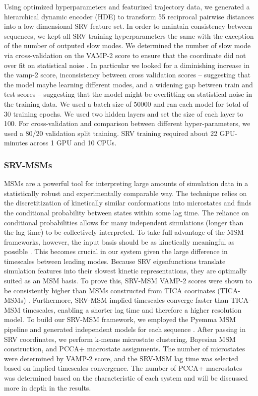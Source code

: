 \documentclass[journal=jpcbfk,manuscript=article]{achemso}
\begin{document}
Using optimized hyperparameters and featurized trajectory data, we generated a hierarchical dynamic encoder (HDE) to transform 55 reciprocal pairwise distances into a low dimensional SRV feature set. In order to maintain consistency between sequences, we kept all SRV training hyperparameters the same with the exception of the number of outputed slow modes. We determined the number of slow mode via cross-validation on the VAMP-2 score to ensure that the coordinate did not over fit on statistical noise \citep{McGibbon2015VariationalKinetics}. In particular we looked for a diminishing increase in the vamp-2 score, inconsistency between cross validation scores -- suggesting that the model maybe learning different modes, and a widening gap between train and test scores -- suggesting that the model might be overfitting on statistical noise in the training data. We used a batch size of 50000 and ran each model for total of 30 training epochs. We used two hidden layers and set the size of each layer to 100. For cross-validation and comparison between different hyper-parameters, we used a 80/20 validation split training. SRV training required about 22 GPU-minutes across 1 GPU and 10 CPUs.

\subsubsection{\label{sec:methods}SRV-MSMs}

MSMs are a powerful tool for interpreting large amounts of simulation data in a statistically robust and experimentally comparable way. The technique relies on the discretitization of kinetically similar conformations into microstates and finds the conditional probability between states within some lag time. The reliance on conditional probabilities allows for many independent simulations (longer than the lag time) to be collectively interpreted. To take full advantage of the MSM frameworks, however, the input basis should be as kinetically meaningful as possible \citep{Pande2010EverythingAsk}. This becomes crucial in our system given the large difference in timescales between leading modes. Because SRV eigenfunctions translate simulation features into their slowest kinetic representations, they are optimally suited as an MSM basis. To prove this, SRV-MSM VAMP-2 scores were shown to be consistently higher than MSMs constructed from TICA coorinates (TICA-MSMs) \citep{Sidky}. Furthermore, SRV-MSM implied timescales converge faster than TICA-MSM timescales, enabling a shorter lag time and therefore a higher resolution model. To build our SRV-MSM framework, we employed the Pyemma MSM pipeline and generated independent models for each sequence \citep{Scherer2015PyEMMAModels}. After passing in SRV coordinates, we perform k-means microstate clustering, Bayesian MSM construction, and PCCA+ macrostate assignments. The number of microstates were determined by VAMP-2 score, and the SRV-MSM lag time was selected based on implied timescales convergence.  The number of PCCA+ macrostates was determined based on the characteristic of each system and will be discussed more in depth in the results. 
\end{document}
